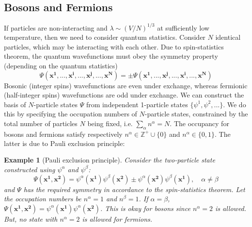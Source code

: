 \documentclass[a4paper]{article}
\newtheorem{eg}{Example}[section]
\theoremstyle{new}
\begin{document}
\subsection{Bosons and Fermions}
If particles are non-interacting and $\lambda\sim(V/N)^{1/3}$ at sufficiently low temperature, then we need to consider quantum statistics. Consider $N$ identical particles, which may be interacting with each other. Due to spin-statistics theorem, the quantum wavefunctions must obey the symmetry property (depending on the quantum statistics)
\begin{equation}
\Psi(\mathbf{x^1},...,\mathbf{x^i},...,\mathbf{x^j},...,\mathbf{x^N})=\pm\Psi(\mathbf{x^1},...,\mathbf{x^j},...,\mathbf{x^i},...,\mathbf{x^N})\label{spinstatistics}
\end{equation}
Bosonic (integer spins) wavefunctions are even under exchange, whereas fermionic (half-integer spins) wavefunctions are odd under exchange. We can construct the basis of $N$-particle states $\Psi$ from independent 1-particle states $\{\psi^1, \psi^2,...\}$.  We do this by specifying the occupation numbers of $N$-particle states, constrained by the total number of particles $N$ being fixed, i.e. $\sum_\alpha n^\alpha=N$. The occupancy for bosons and fermions satisfy respectively $n^\alpha\in\mathbb{Z}^+\cup\{0\}$ and $n^\alpha\in\{0,1\}$. The latter is due to Pauli exclusion principle:
\begin{eg}[Pauli exclusion principle]
Consider the two-particle state constructed using $\psi^\alpha$ and $\psi^\beta$:
$$\Psi(\mathbf{x^1},\mathbf{x^2})=\psi^\alpha(\mathbf{x^1})\psi^\beta(\mathbf{x^2})\pm\psi^\alpha(\mathbf{x^2})\psi^\beta(\mathbf{x^1}),\quad\alpha\neq\beta$$
and $\Psi$ has the required symmetry in accordance to the spin-statistics theorem. Let the occupation numbers be $n^\alpha=1$ and $n^\beta =1$. If $\alpha=\beta$, $\Psi(\mathbf{x^1},\mathbf{x^2})=\psi^\alpha(\mathbf{x^1})\psi^\alpha(\mathbf{x^2})$. This is okay for bosons since $n^\alpha=2$ is allowed. But, no state with $n^\alpha=2$ is allowed for fermions.
\end{eg}
\end{document}

